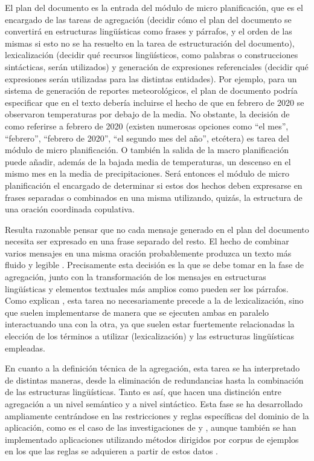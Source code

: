 El plan del documento es la entrada del módulo de micro planificación, que es el encargado de las tareas de agregación (decidir cómo el plan del documento se convertirá en estructuras lingüísticas como frases y párrafos, y el orden de las mismas si esto no se ha resuelto en la tarea de estructuración del documento), lexicalización (decidir qué recursos lingüísticos, como palabras o construcciones sintácticas, serán utilizados) y generación de expresiones referenciales (decidir qué expresiones serán utilizadas para las distintas entidades). Por ejemplo, para un sistema de generación de reportes meteorológicos, el plan de documento podría especificar que en el texto debería incluirse el hecho de que en febrero de 2020 se observaron temperaturas por debajo de la media. No obstante, la decisión de como referirse a febrero de 2020 (existen numerosas opciones como ``el mes'', ``febrero'', ``febrero de 2020'', ``el segundo mes del año'', etcétera) es tarea del módulo de micro planificación. O también la salida de  la macro planificación puede añadir, además de la bajada media de temperaturas, un descenso en el mismo mes en la media de precipitaciones. Será entonces el módulo de micro planificación el encargado de determinar si estos dos hechos deben expresarse en frases separadas o combinados en una misma utilizando, quizás, la estructura de una oración coordinada copulativa.

Resulta razonable pensar que no cada mensaje generado en el plan del documento necesita ser expresado en una frase separado del resto. El hecho de combinar varios mensajes en una misma oración probablemente produzca un texto más fluido y legible \citep{dalianis1999aggregation, cheng2000capturing}. Precisamente esta decisión es la que se debe tomar en la fase de agregación, junto con la transformación de los mensajes en estructuras lingüísticas y elementos textuales más amplios como pueden ser los párrafos. Como explican \cite{biblia}, esta tarea no necesariamente precede a la de lexicalización, sino que suelen implementarse de manera que se ejecuten ambas en paralelo interactuando una con la otra, ya que suelen estar fuertemente relacionadas la elección de los términos a utilizar (lexicalización) y las estructuras lingüísticas empleadas.

En cuanto a la definición técnica de la agregación, esta tarea se ha interpretado de distintas maneras, desde la eliminación de redundancias hasta la combinación de las estructuras lingüísticas. Tanto es así, que \cite{reape1999just} hacen una distinción entre agregación a un nivel semántico y a nivel sintáctico. Esta fase se ha desarrollado ampliamente centrándose en las restricciones y reglas específicas del dominio de la aplicación, como es el caso de las investigaciones de \cite{hovy1987generating} y \cite{shaw1998clause}, aunque también se han implementado aplicaciones utilizando métodos dirigidos por corpus de ejemplos en los que las reglas se adquieren a partir de estos datos \citep{walker2001spot, stent2004trainable}.

